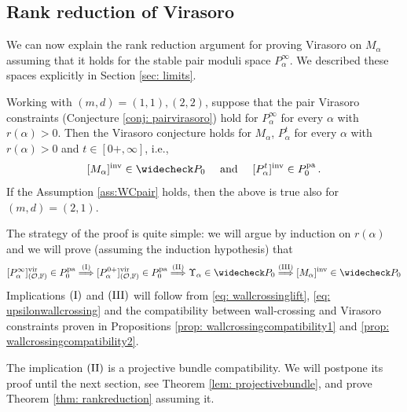 \documentclass[a4paper, 12pt]{amsart}
\begin{document}
\subsection{Rank reduction of Virasoro}

We can now explain the rank reduction argument for proving Virasoro on $M_\alpha$ assuming that it holds for the stable pair moduli space $P_\alpha^\infty$. We described these spaces explicitly in Section \ref{sec: limits}.

\begin{theorem}\label{thm: rankreduction}

Working with $(m,d)= (1,1),(2,2)$, suppose that the pair Virasoro constraints (Conjecture \ref{conj: pairvirasoro}) hold for $P_\alpha^\infty$ for every $\alpha$ with $r(\alpha)> 0$.
Then the Virasoro conjecture holds for $M_\alpha$, $P^t_{\alpha}$ for every $\alpha$ with $r(\alpha)>0$ and $t\in [0+, \infty]$, i.e.,
\[[M_\alpha]^\inva \in \widecheck P_0\quad \textup{ and }\quad [P_\alpha^t]^\inva \in P_0^{\pa}\,.\]
If the Assumption \ref{ass:WCpair} holds, then the above is true also for $(m,d) =(2,1)$. 
\end{theorem}

The strategy of the proof is quite simple: we will argue by induction on $r(\alpha)$ and we will prove (assuming the induction hypothesis) that
\[[P_\alpha^\infty]^\vir_{(\CO, \BF)}\in P_0^{\pa}\overset{(\textup{I})}{\Longrightarrow} [P_\alpha^{0+}]^\vir_{(\CO, \BF)}\in P_0^{\pa}\overset{(\textup{II})}{\Longrightarrow} \Upsilon_\alpha\in \widecheck P_0\overset{(\textup{III})}{\Longrightarrow} [M_\alpha]^{\inva}\in  \widecheck P_0\]
Implications $(\textup{I})$ and $(\textup{III})$ will follow from \eqref{eq: wallcrossinglift}, \eqref{eq: upsilonwallcrossing} and the compatibility between wall-crossing and Virasoro constraints proven in Propositions \ref{prop: wallcrossingcompatibility1} and \ref{prop: wallcrossingcompatibility2}.

The implication $(\textup{II})$ is a projective bundle compatibility. We will postpone its proof until the next section, see Theorem \ref{lem: projectivebundle}, and prove Theorem \ref{thm: rankreduction} assuming it. 
\end{document}
